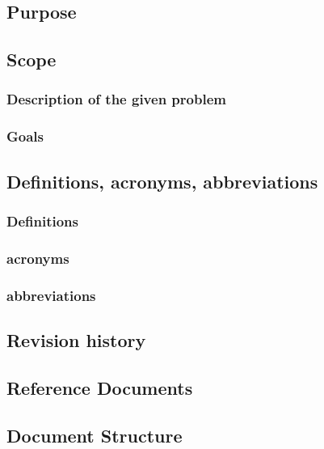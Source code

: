 

\subsection{Purpose}


\subsection{Scope}
\subsubsection{Description of the given problem}
\subsubsection{Goals}


\subsection{Definitions,  acronyms,  abbreviations}
\subsubsection{Definitions}
\subsubsection{acronyms}
\subsubsection{abbreviations}


\subsection{Revision history}


\subsection{Reference Documents}


\subsection{Document Structure}


